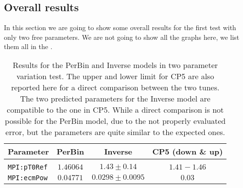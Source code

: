\clearpage
\subsection{Overall results}
\label{subsec:Overall2PARAMS}

In this section we are going to show some overall results for the first test with only two free parameters. We are not going to show all the graphs here, we list them all in the  .

\begin{table}[!htb]
\centering
	\begin{tabular}{l | c | c | c}
		Parameter & PerBin & Inverse & CP5 (down \& up)\\ \hline\hline
		\\[-0.85em]		
		\texttt{MPI:pT0Ref} & $ 1.46064$ & $ 1.43 \pm 0.14 $ & $1.41 - 1.46$ \\[2pt]
		\texttt{MPI:ecmPow} & $ 0.04771$ & $ 0.0298 \pm 0.0095 $ & $0.03$\\[2pt]
	\end{tabular}
	\caption{Results for the PerBin and Inverse models in two parameter variation test. The upper and lower limit for CP5 are also reported here for a direct comparison between the two tunes.
The two predicted parameters for the Inverse model are compatible to the one in CP5. While a direct comparison is not possible for the PerBin model, due to the not properly evaluated error, but the parameters are quite similar to the expected ones.}
	\label{table:ResultInverse_2params}
\end{table}



